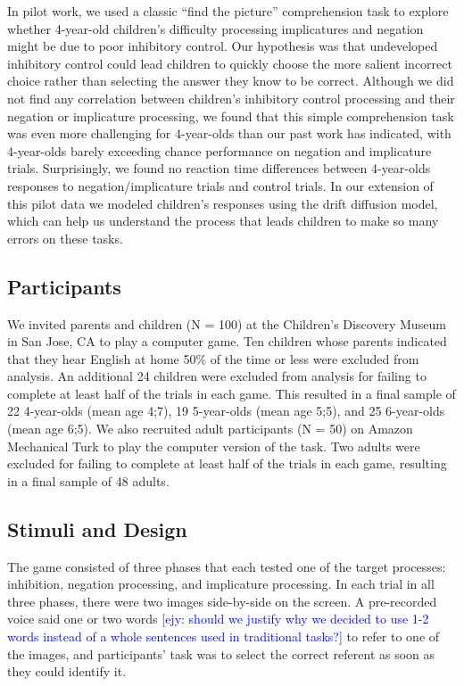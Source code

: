 \documentclass[10pt,letterpaper]{article}
\newcommand{\ejy}[1]{\textcolor{Blue}{[ejy: #1]}}
\begin{document}
In pilot work, we used a classic ``find the picture'' comprehension task to explore whether 4-year-old children's difficulty processing implicatures and negation might be due to poor inhibitory control.  Our hypothesis was that undeveloped inhibitory control could lead children to quickly choose the more salient incorrect choice rather than selecting the answer they know to be correct.  Although we did not find any correlation between children's inhibitory control processing and their negation or implicature processing, we found that this simple comprehension task was even more challenging for 4-year-olds than our past work has indicated, with 4-year-olds barely exceeding chance performance on negation and implicature trials.  Surprisingly, we found no reaction time differences between 4-year-olds responses to negation/implicature trials and control trials. In our extension of this pilot data we modeled children's responses using the drift diffusion model, which can help us understand the process that leads children to make so many errors on these tasks.  

\subsection{Participants}

We invited parents and children (N = 100) at the Children's Discovery Museum in San Jose, CA to play a computer game.  Ten children whose parents indicated that they hear English at home 50\% of the time or less were excluded from analysis.  An additional 24 children were excluded from analysis for failing to complete at least half of the trials in each game.  This resulted in a final sample of 22 4-year-olds (mean age 4;7), 19 5-year-olds (mean age 5;5), and 25 6-year-olds (mean age 6;5).  We also recruited adult participants (N = 50) on Amazon Mechanical Turk to play the computer version of the task.  Two adults were excluded for failing to complete at least half of the trials in each game, resulting in a final sample of 48 adults.  

\subsection{Stimuli and Design}

The game consisted of three phases that each tested one of the target processes: inhibition, negation processing, and implicature processing.  In each trial in all three phases, there were two images side-by-side on the screen. A pre-recorded voice said one or two words \ejy{should we justify why we decided to use 1-2 words instead of a whole sentences used in traditional tasks?} to refer to one of the images, and participants' task was to select the correct referent as soon as they could identify it.
\end{document}
